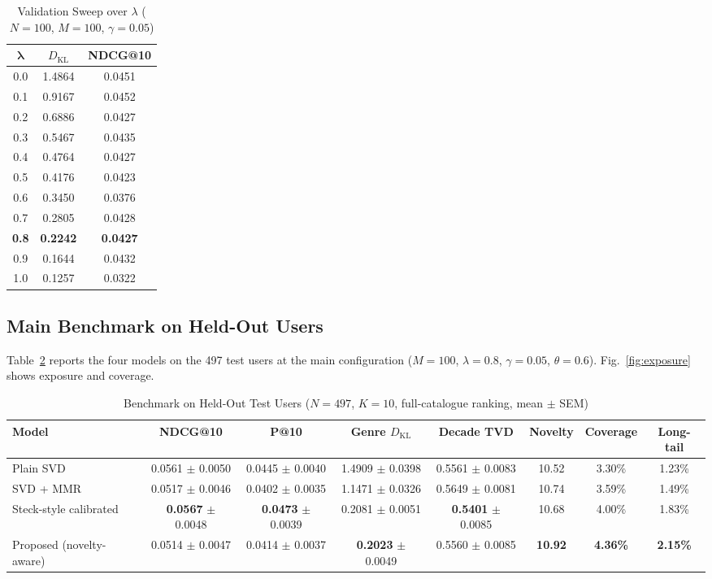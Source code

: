\documentclass[conference]{IEEEtran}
\newcommand{\KL}{D_{\mathrm{KL}}}
\begin{document}
  \begin{table}[t]
  \centering
  \caption{Validation Sweep over $\lambda$ ($N=100$, $M=100$, $\gamma=0.05$)}
  \label{tab:val}
  \renewcommand{\arraystretch}{1.1}
  \small
  \begin{tabular}{@{}ccc@{}}
  \toprule
  $\boldsymbol\lambda$ & \textbf{$\KL$} & \textbf{NDCG@10}\\
  \midrule
  0.0 & 1.4864 & 0.0451\\
  0.1 & 0.9167 & 0.0452\\
  0.2 & 0.6886 & 0.0427\\
  0.3 & 0.5467 & 0.0435\\
  0.4 & 0.4764 & 0.0427\\
  0.5 & 0.4176 & 0.0423\\
  0.6 & 0.3450 & 0.0376\\
  0.7 & 0.2805 & 0.0428\\
  \textbf{0.8} & \textbf{0.2242} & \textbf{0.0427}\\
  0.9 & 0.1644 & 0.0432\\
  1.0 & 0.1257 & 0.0322\\
  \bottomrule
  \end{tabular}
  \end{table}

  \subsection{Main Benchmark on Held-Out Users}
  Table~\ref{tab:main} reports the four models on the 497 test users at the main configuration ($M=100$, $\lambda=0.8$, $\gamma=0.05$, $\theta=0.6$). Fig.~\ref{fig:exposure} shows exposure and coverage.

  \begin{table}[t]
  \centering
  \caption{Benchmark on Held-Out Test Users ($N=497$, $K=10$, full-catalogue ranking, mean $\pm$ SEM)}
  \label{tab:main}
  \renewcommand{\arraystretch}{1.1}
  \small
  \begin{tabular}{@{}lccccccc@{}}
  \toprule
  \textbf{Model} & \textbf{NDCG@10} & \textbf{P@10} & \textbf{Genre $\KL$} & \textbf{Decade TVD} & \textbf{Novelty} & \textbf{Coverage} & \textbf{Long-tail}\\
  \midrule
  Plain SVD & 0.0561 $\pm$ 0.0050 & 0.0445 $\pm$ 0.0040 & 1.4909 $\pm$ 0.0398 & 0.5561 $\pm$ 0.0083 & 10.52 & 3.30\% & 1.23\%\\
  SVD + MMR \cite{carbonell1998} & 0.0517 $\pm$ 0.0046 & 0.0402 $\pm$ 0.0035 & 1.1471 $\pm$ 0.0326 & 0.5649 $\pm$ 0.0081 & 10.74 & 3.59\% & 1.49\%\\
  Steck-style calibrated & \textbf{0.0567} $\pm$ 0.0048 & \textbf{0.0473} $\pm$ 0.0039 & 0.2081 $\pm$ 0.0051 & \textbf{0.5401} $\pm$ 0.0085 & 10.68 & 4.00\% & 1.83\%\\
  Proposed (novelty-aware) & 0.0514 $\pm$ 0.0047 & 0.0414 $\pm$ 0.0037 & \textbf{0.2023} $\pm$ 0.0049 & 0.5560 $\pm$ 0.0085 & \textbf{10.92} & \textbf{4.36\%} & \textbf{2.15\%}\\
  \bottomrule
  \end{tabular}
  \end{table}
\end{document}
